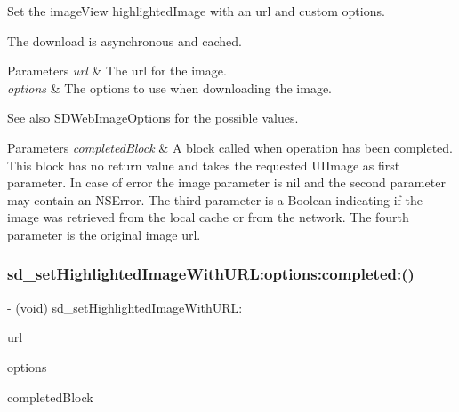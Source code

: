 Set the image\+View {\ttfamily highlighted\+Image} with an {\ttfamily url} and custom options.

The download is asynchronous and cached.


\begin{DoxyParams}{Parameters}
{\em url} & The url for the image. \\
\hline
{\em options} & The options to use when downloading the image. \\
\hline
\end{DoxyParams}
\begin{DoxySeeAlso}{See also}
S\+D\+Web\+Image\+Options for the possible values. 
\end{DoxySeeAlso}

\begin{DoxyParams}{Parameters}
{\em completed\+Block} & A block called when operation has been completed. This block has no return value and takes the requested U\+I\+Image as first parameter. In case of error the image parameter is nil and the second parameter may contain an N\+S\+Error. The third parameter is a Boolean indicating if the image was retrieved from the local cache or from the network. The fourth parameter is the original image url. \\
\hline
\end{DoxyParams}
\mbox{\label{category_u_i_image_view_07_highlighted_web_cache_08_a3bbfcd1433513161520293acac8f9fff}} 
\subsubsection{\texorpdfstring{sd\+\_\+set\+Highlighted\+Image\+With\+U\+R\+L\+:options\+:completed\+:()}{sd\_setHighlightedImageWithURL:options:completed:()}\hspace{0.1cm}{\footnotesize\ttfamily [3/3]}}
{\footnotesize\ttfamily -\/ (void) sd\+\_\+set\+Highlighted\+Image\+With\+U\+R\+L\+: \begin{DoxyParamCaption}\item[{(N\+S\+U\+RL $\ast$)}]{url }\item[{options:(S\+D\+Web\+Image\+Options)}]{options }\item[{completed:(S\+D\+Web\+Image\+Completion\+Block)}]{completed\+Block }\end{DoxyParamCaption}}

